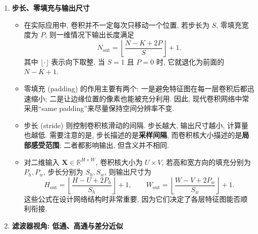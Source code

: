 \documentclass{../nndlcourse}
\begin{document}
\begin{enumerate}
\begin{itemize}
        \item 很多同学会疑惑: 为什么卷积看起来像是把卷积核“倒过来”再滑动? 从公式上看, 这是因为卷积要比较当前输出位置与输入中相对位移后的各个分量, 因而指标里会出现 $t-k+1$ 这样的反向偏移. 这种写法与线性时不变系统的冲激响应表示天然一致.
        \item 若不对卷积核翻转, 写成
        \begin{equation*}
            y_t = \sum_{k=1}^{K} w_k x_{t+k-1},
        \end{equation*}
        则对应的更准确名称是互相关 (cross-correlation). 现代深度学习框架大多直接实现互相关, 但由于卷积核参数是通过训练学习出来的, 翻转与否通常不会限制模型表达能力, 所以工程上仍习惯称为“卷积层”.
    \end{itemize}
    \item \textbf{步长、零填充与输出尺寸}
    \begin{itemize}
        \item 在实际应用中, 卷积并不一定每次只移动一个位置. 若步长为 $S$, 零填充宽度为 $P$, 则一维情况下输出长度满足
        \begin{equation*}
            N_{\mathrm{out}} = \left\lfloor \frac{N - K + 2P}{S} \right\rfloor + 1.
        \end{equation*}
        其中 $\lfloor \cdot \rfloor$ 表示向下取整. 当 $S = 1$ 且 $P = 0$ 时, 它就退化为前面的 $N-K+1$.
        \item 零填充 (padding) 的作用主要有两个: 一是避免特征图在每一层卷积后都迅速缩小; 二是让边缘位置的像素也能被充分利用. 因此, 现代卷积网络中常采用“same padding”来尽量保持空间分辨率不变.
        \item 步长 (stride) 则控制卷积核滑动的间隔. 步长越大, 输出尺寸越小, 计算量也越低. 需要注意的是, 步长描述的是\textbf{采样间隔}, 而卷积核大小描述的是\textbf{局部感受范围}; 二者都影响输出, 但含义并不相同.
        \item 对二维输入 $\boldsymbol{X} \in \mathbb{R}^{H \times W}$, 卷积核大小为 $U \times V$, 若高和宽方向的填充分别为 $P_h, P_w$, 步长分别为 $S_h, S_w$, 则输出尺寸为
        \begin{equation*}
            H_{\mathrm{out}} = \left\lfloor \frac{H-U+2P_h}{S_h} \right\rfloor + 1,
            \qquad
            W_{\mathrm{out}} = \left\lfloor \frac{W-V+2P_w}{S_w} \right\rfloor + 1.
        \end{equation*}
        这些公式在设计网络结构时非常重要, 因为它们决定了各层特征图能否顺利衔接.
    \end{itemize}
    \item \textbf{滤波器视角: 低通、高通与差分近似}

\end{enumerate}
\end{document}
